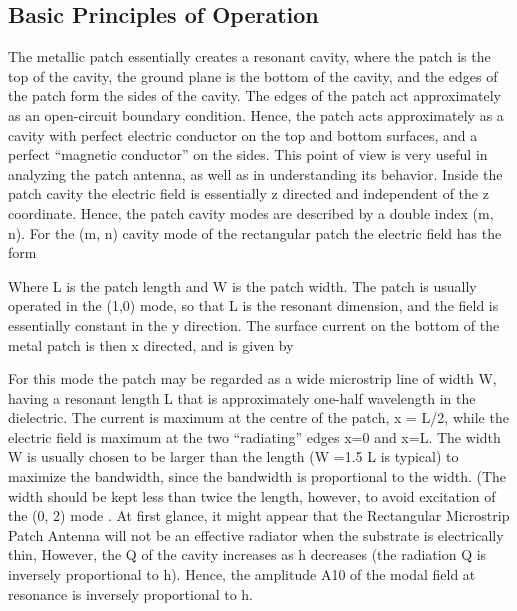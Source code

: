 \documentclass[12pt]{article}
\begin{document}
					               \subsection{ Basic Principles of Operation}
					                \justify
					                 The  metallic  patch  essentially  creates  a  resonant  cavity,  where  the  patch  is  the  top  of  the cavity, the ground plane is the bottom of the cavity, and the edges of the patch form the sides of the cavity. The edges of the patch act approximately as an open-circuit boundary condition. Hence, the patch acts approximately as a cavity with perfect electric conductor on the top and bottom surfaces, and a perfect “magnetic conductor” on the sides. This point of view is very useful in analyzing the patch antenna, as well as in understanding its behavior. Inside the patch cavity the electric field is essentially z directed and independent of the z coordinate. Hence, the patch cavity modes are described by a double index (m, n). For the (m, n) cavity mode of the rectangular patch the electric field has the form
					                 
					                 Where L is the patch length and W is the patch width. The patch is usually operated in the (1,0) mode,  so  that  L  is  the  resonant  dimension,  and  the  field  is  essentially  constant  in  the y direction. The surface current on the bottom of the metal patch is then x directed, and is given by
					                 
					                 For  this  mode  the  patch  may  be  regarded  as  a  wide  microstrip  line  of  width  W,  having  a resonant  length  L  that  is  approximately  one-half  wavelength  in  the  dielectric.  The  current  is maximum  at  the  centre  of  the  patch,  x  =  L/2,  while  the  electric  field  is  maximum  at  the  two “radiating” edges x=0 and x=L. The width W is usually chosen to be larger than the length (W =1.5 L is typical) to maximize the bandwidth, since the bandwidth is proportional to the width. (The width should be kept less than twice the length, however, to avoid excitation of the (0, 2) mode .
					                 At first glance, it might appear that the Rectangular Microstrip Patch Antenna will not be an effective radiator when the substrate is electrically thin,   However, the Q of the cavity increases as  h decreases (the radiation Q is inversely proportional to h). Hence, the amplitude A10  of the modal field  at  resonance  is  inversely  proportional  to  h.  
					                 
\end{document}
